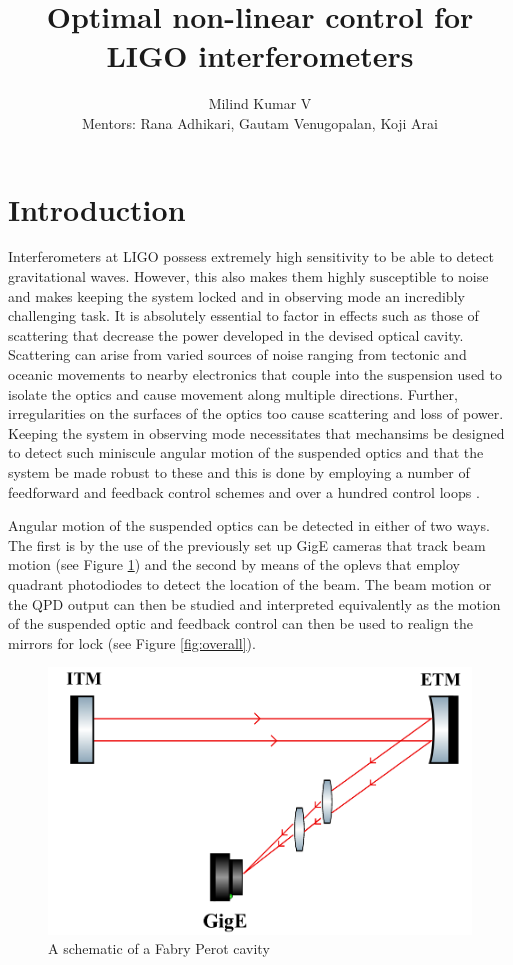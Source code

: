 \documentclass[colorlinks=true,pdfstartview=FitV,linkcolor=blue,
            citecolor=red,urlcolor=magenta]{ligodoc}
\title{Optimal non-linear control for LIGO interferometers}
\author{Milind Kumar V \\ Mentors: Rana Adhikari, Gautam Venugopalan, Koji Arai}
\begin{document}
\section{Introduction}\label{introduction}

Interferometers at LIGO possess extremely high sensitivity to be able to detect gravitational waves. However, this also makes them highly susceptible to noise and makes keeping the system locked and in observing mode an incredibly challenging task. It is absolutely essential to factor in effects such as those of scattering that decrease the power developed in the devised optical cavity. Scattering can arise from varied sources of noise ranging from tectonic and oceanic movements to nearby electronics that couple into the suspension used to isolate the optics and cause movement along multiple directions. Further, irregularities on the surfaces of the optics too cause scattering and loss of power. Keeping the system in observing mode necessitates that mechansims be designed to detect such miniscule angular motion of the suspended optics and that the system be made robust to these and this is done by employing a number of feedforward and feedback control schemes and over a hundred control loops \cite{adhikari2004sensitivity}.


Angular motion of the suspended optics can be detected in either of two ways. The first is by the use of the previously set up GigE cameras \cite{gige} that track beam motion (see Figure \ref{fig:gige}) and the second by means of the oplevs that employ quadrant photodiodes to detect the location of the beam. The beam motion or the QPD output can then be studied and interpreted equivalently as the motion of the suspended optic and feedback control can then be used to realign the mirrors for lock (see Figure \ref{fig:overall}).  

\begin{figure}[htbp]
\begin{center}
\includegraphics[width=.8\linewidth]{gige.png}
\caption{A schematic of a Fabry Perot cavity}
\label{fig:gige}
\end{center}
\end{figure} 
\end{document}
